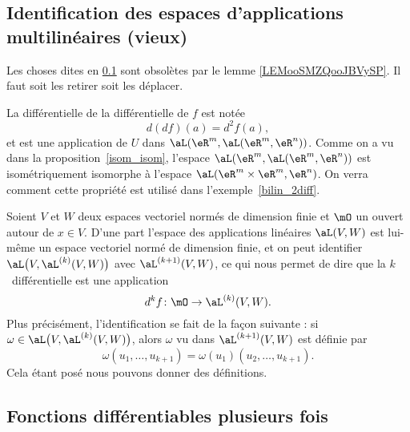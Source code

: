 \subsection{Identification des espaces d'applications multilinéaires (vieux)}
\label{SUBSECooXBGUooXYFZjy}

\begin{probleme}        \label{PROBooDLAWooLqHDPs}
    Les choses dites en \ref{SUBSECooXBGUooXYFZjy} sont obsolètes par le lemme \ref{LEMooSMZQooJBVySP}. Il faut soit les retirer soit les déplacer.
\end{probleme}

La différentielle de la différentielle de $f$ est notée
\[
d(df)(a)=d^2f(a),
\]
et est une application de $U$ dans $\aL(\eR^m,\aL(\eR^m, \eR^n) )$. Comme on a vu dans la proposition~\ref{isom_isom}, l'espace $\aL(\eR^m,\aL(\eR^m, \eR^n) )$ est isométriquement isomorphe à l'espace $\aL(\eR^m\times\eR^m, \eR^n )$. On verra comment cette propriété  est utilisé dans l'exemple~\ref{bilin_2diff}.


Soient \( V\) et \( W\) deux espaces vectoriel normés de dimension finie et \( \mO\) un ouvert autour de \( x\in V\). D'une part l'espace des applications linéaires \( \aL(V,W)\) est lui-même un espace vectoriel normé de dimension finie, et on peut identifier \(  \aL\big( V,\aL^{(k)}(V,W) \big)\) avec \( \aL^{(k+1)}(V,W)\), ce qui nous permet de dire que la \( k\)\ieme\ différentielle est une application
\begin{equation}
    d^kf\colon \mO\to \aL^{(k)}(V,W).
\end{equation}
Plus précisément, l'identification se fait de la façon suivante : si \( \omega\in \aL\big( V,\aL^{(k)}(V,W) \big)\), alors \( \omega\) vu dans \( \aL^{(k+1)}(V,W)\) est définie par
\begin{equation}
    \omega(u_1,\ldots, u_{k+1})=\omega(u_1)(u_2,\ldots, u_{k+1}).
\end{equation}
Cela étant posé nous pouvons donner des définitions.

\subsection{Fonctions différentiables plusieurs fois}

